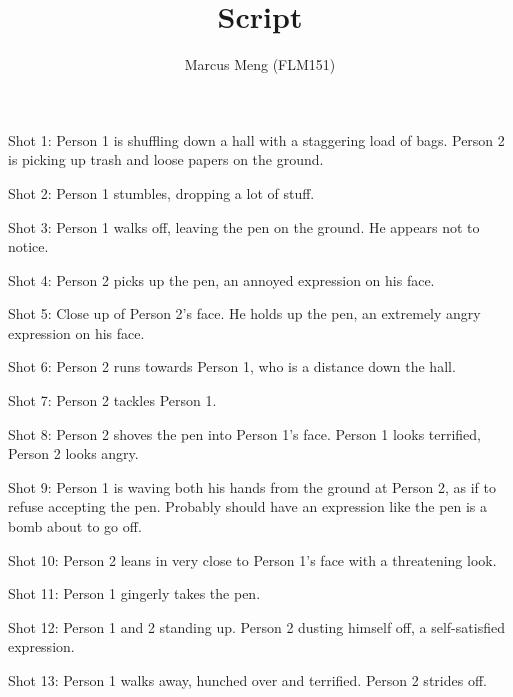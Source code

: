 \documentclass{article}
\title{Script}
\author{Marcus Meng (FLM151)}
\begin{document}
\maketitle

Shot 1: Person 1 is shuffling down a hall with a staggering load of bags.
Person 2 is picking up trash and loose papers on the ground.

Shot 2: Person 1 stumbles, dropping a lot of stuff.

Shot 3: Person 1 walks off, leaving the pen on the ground.
He appears not to notice.

Shot 4: Person 2 picks up the pen, an annoyed expression on his face.

Shot 5: Close up of Person 2's face.
He holds up the pen, an extremely angry expression on his face.

Shot 6: Person 2 runs towards Person 1, who is a distance down the hall.

Shot 7: Person 2 tackles Person 1.

Shot 8: Person 2 shoves the pen into Person 1's face.
Person 1 looks terrified, Person 2 looks angry.

Shot 9: Person 1 is waving both his hands from the ground at Person 2, as if to refuse accepting the pen.
Probably should have an expression like the pen is a bomb about to go off.

Shot 10: Person 2 leans in very close to Person 1's face with a threatening look.

Shot 11: Person 1 gingerly takes the pen.

Shot 12: Person 1 and 2 standing up.
Person 2 dusting himself off, a self-satisfied expression.

Shot 13: Person 1 walks away, hunched over and terrified.
Person 2 strides off.
\end{document}
